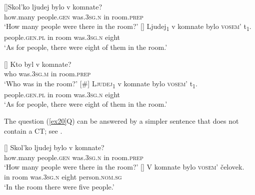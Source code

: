 \documentclass[output=paper,
modfonts,
newtxmath,
hidelinks
]{langscibook}
\begin{document}
\begin{exe} 
\ex \label{ex20}
\begin{xlist}
[]{\gll Skol’ko ljudej bylo v komnate?\\
how.many people.\textsc{gen} was.\textsc{3sg.n} in room.\textsc{prep}\\
	\glt `How many people were there in the room?'
    }
[]{ 
	\gll Ljudej\textsubscript{1}    v   komnate  bylo     \textsc{vosem’}   t\textsubscript{1}.\\
		 people.\textsc{gen.pl} in   room    was.\textsc{3sg.n}  eight  \\
	\glt `As for people, there were eight of them in the room.'
    }
\end{xlist}
\end{exe}

\begin{exe}
\ex \label{ex21}
\begin{xlist}
[]{
	\gll 
    	 Kto byl v komnate?\\
         who was.\textsc{3sg.m} in room.\textsc{prep}\\
	\glt `Who was in the room?'
    }
[\#]{
	\gll \textsc{Ljudej\textsubscript{1}}  v   komnate  bylo     \textsc{vosem’}   t\textsubscript{1}.\\
		 people.\textsc{gen.pl} in   room    was.\textsc{3sg.n}  eight  \\
    	\glt `As for people, there were eight of them in the room.'
        }
\end{xlist}
\end{exe}

\noindent The question (\ref{ex20}Q) can be answered by a simpler sentence that does not contain a CT; see .

\begin{exe}
\ex \label{ex22}
\begin{xlist}
[]{
	\gll 
    	 Skol’ko ljudej bylo v komnate?\\
         how.many people.\textsc{gen} was.\textsc{3sg.n} in room.\textsc{prep}\\
	\glt `How many people were there in the room?'
    }
[]{
	\gll V  komnate  bylo    \textsc{vosem’}    čelovek.\\
		 in  room    was.\textsc{3sg.n}  eight     person.\textsc{nom.sg}\\
    \glt `In the room there were five people.'     
    }
\end{xlist}
\end{exe}
\end{document}
